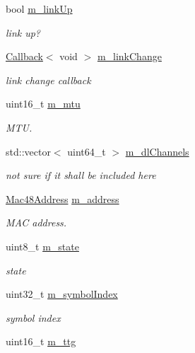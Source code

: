 \begin{DoxyCompactItemize}
bool \hyperlink{classns3_1_1WimaxNetDevice_aecae6cf64706857700337c2807211426}{m\+\_\+link\+Up}
\begin{DoxyCompactList}\small\item\em link up? \end{DoxyCompactList}\item 
\hyperlink{classns3_1_1Callback}{Callback}$<$ void $>$ \hyperlink{classns3_1_1WimaxNetDevice_a9463f500f58fcda35b91076473dacfea}{m\+\_\+link\+Change}
\begin{DoxyCompactList}\small\item\em link change callback \end{DoxyCompactList}\item 
uint16\+\_\+t \hyperlink{classns3_1_1WimaxNetDevice_a33284a85d4dfdafa8b0a70e95777a462}{m\+\_\+mtu}
\begin{DoxyCompactList}\small\item\em M\+TU. \end{DoxyCompactList}\item 
std\+::vector$<$ uint64\+\_\+t $>$ \hyperlink{classns3_1_1WimaxNetDevice_a158c8081d3581869c50f4de4efbdd620}{m\+\_\+dl\+Channels}
\begin{DoxyCompactList}\small\item\em not sure if it shall be included here \end{DoxyCompactList}\item 
\hyperlink{classns3_1_1Mac48Address}{Mac48\+Address} \hyperlink{classns3_1_1WimaxNetDevice_a1bceab06d8dd085392957fadeabb0a67}{m\+\_\+address}
\begin{DoxyCompactList}\small\item\em M\+AC address. \end{DoxyCompactList}\item 
uint8\+\_\+t \hyperlink{classns3_1_1WimaxNetDevice_a23e30d6035386b7e3b2daa630cf8a44e}{m\+\_\+state}
\begin{DoxyCompactList}\small\item\em state \end{DoxyCompactList}\item 
uint32\+\_\+t \hyperlink{classns3_1_1WimaxNetDevice_ae1c1580ec03c9632b46bc8a16eeb9ee5}{m\+\_\+symbol\+Index}
\begin{DoxyCompactList}\small\item\em symbol index \end{DoxyCompactList}\item 
uint16\+\_\+t \hyperlink{classns3_1_1WimaxNetDevice_aaef4d81157125f55f12093b45eabdc93}{m\+\_\+ttg}

\end{DoxyCompactItemize}
